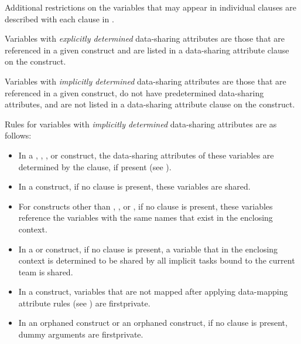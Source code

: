 Additional restrictions on the variables that may appear in individual clauses are 
described with each clause in .

Variables with \emph{explicitly determined} data-sharing attributes are those that are referenced 
in a given construct and are listed in a data-sharing attribute clause on the construct.

Variables with \emph{implicitly determined} data-sharing attributes are those that are referenced 
in a given construct, do not have predetermined data-sharing attributes, and are not 
listed in a data-sharing attribute clause on the construct.

Rules for variables with \emph{implicitly determined} data-sharing attributes are as follows:

\begin{itemize}
\item In a , , , or  construct, the data-sharing attributes of these variables are
determined by the  clause, if present (see
).

\item In a  construct, if no  clause is present, these variables are 
shared.

\item For constructs other than , , or , if no  clause is present, these variables reference the variables with the same names that exist in the enclosing context.

\item In a  or  construct, if no  clause is present, a variable that in the 
enclosing context is determined to be shared by all implicit tasks bound to the current 
team is shared.

\item In a  construct, variables that are not mapped after applying data-mapping attribute rules (see ) are firstprivate.
\end{itemize}

\begin{samepage}
\fortranspecificstart
\begin{itemize}
\item In an orphaned  construct or an orphaned  
construct, if no  clause is present, dummy arguments 
are firstprivate.
\end{itemize}
\fortranspecificend
\end{samepage}

